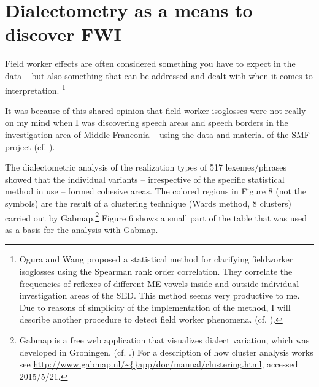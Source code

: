 \documentclass[output=paper]{LSP/langsci}
\begin{document}
\section{Dialectometry as a means to discover FWI}
Field worker effects are often considered something you have to expect in the data – but also something that can be addressed and dealt with when it comes to interpretation.
\footnote{Ogura and Wang proposed a statistical {\textquotedbl}method for clarifying fieldworker isoglosses{\textquotedbl} using the Spearman rank order correlation. They correlate the frequencies of reflexes of different ME vowels inside and outside individual investigation areas of the SED. This method seems very productive to me. Due to reasons of simplicity of the implementation of the method, I will describe another procedure to detect field worker phenomena. (cf. \citealt{ogura_isoglosses_1992}).}

It was because of this shared opinion that field worker isoglosses were not really on my mind when I was discovering speech areas and speech borders in the investigation area of Middle Franconia – using the data and material of the SMF-project (cf. \citealt{mathussek_sprachraume_2014}).

The dialectometric analysis of the realization types of 517 lexemes/phrases showed that the individual variants – irrespective of the specific statistical method in use – formed cohesive areas. The colored regions in Figure 8 (not the symbols) are the result of a clustering technique (Ward{\textquotesingle}s method, 8 clusters) carried out by Gabmap.\footnote{Gabmap is a free {\textquotedbl}web application that visualizes dialect variation{\textquotedbl}, which was developed in Groningen. (cf. \citealt{nerbonne_gabmap_2011}.) For a description of how cluster analysis works see \url{http://www.gabmap.nl/\~{}app/doc/manual/clustering.html}, accessed 2015/5/21.} Figure 6 shows a small part of the table that was used as a basis for the analysis with Gabmap.
\end{document}
